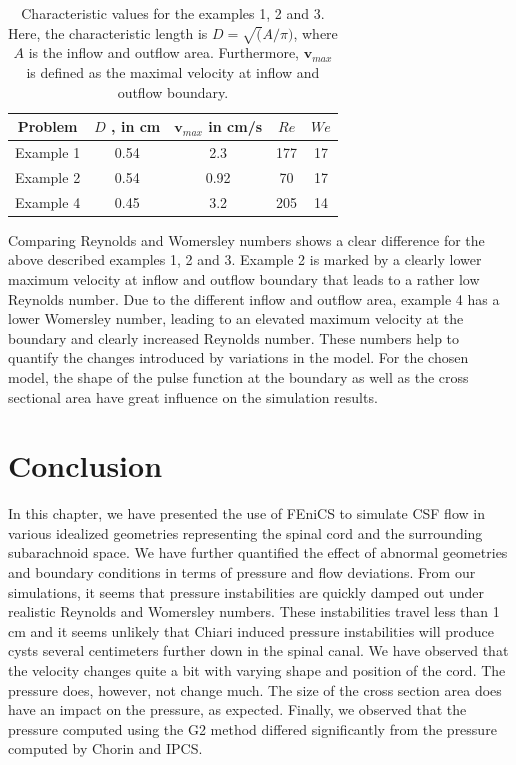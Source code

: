 \begin{table}
\begin{center}
\begin{tabular}{ | c | c | c | c | c |}
\hline
Problem & $D$ ,  in cm & $\mathbf{v}_{max}$ in cm/s  & $Re$ & $We$ \\ \hline\hline
	Example 1 	&	0.54 & 2.3 & 177 & 17	\\ \hline
	Example 2	&	0.54 & 0.92 & 70 & 17	\\ \hline
	Example 4	&	0.45 & 3.2 	& 205 & 14	\\ \hline
    \end{tabular}
	\label{tab:Re_We}
	\caption{Characteristic values for the examples 1, 2 and 3. Here, the  
	characteristic length is $D=\sqrt(A/\pi)$, where  $A$ is the inflow and outflow area. 
        Furthermore, $\mathbf{v}_{max}$ is defined as the maximal velocity at inflow and outflow boundary.
	}
\end{center}\end{table}

Comparing Reynolds and Womersley numbers shows a clear difference for
the above described examples 1, 2 and 3. Example 2 is marked by a
clearly lower maximum velocity at inflow and outflow boundary that
leads to a rather low Reynolds number. Due to the different inflow and
outflow area, example 4 has a lower Womersley number, leading to an
elevated maximum velocity at the boundary and clearly increased
Reynolds number. These numbers help to quantify the changes
introduced by variations in the model. For the chosen model, the shape
of the pulse function at the boundary as well as the cross
sectional area have great influence on the simulation results. 

\section{Conclusion}
In this chapter, we have presented the use of FEniCS to simulate CSF flow in 
various idealized geometries representing the
spinal cord and the surrounding subarachnoid space. We have further 
quantified the effect of abnormal geometries and boundary conditions 
in terms of pressure and flow deviations. From our simulations, it seems
that pressure instabilities are quickly damped out under realistic Reynolds and 
Womersley numbers. These instabilities travel less than 1 cm and it seems unlikely 
that Chiari induced pressure instabilities will produce cysts several centimeters further
down in the spinal canal. 
We have observed that the velocity changes quite a bit with varying shape and position of the 
cord. The pressure does, however, not change much. The size of the cross section area does have an impact
on the pressure, as expected. 
Finally, we observed that the pressure computed using the G2 method
differed significantly from the pressure computed by Chorin and IPCS. 


